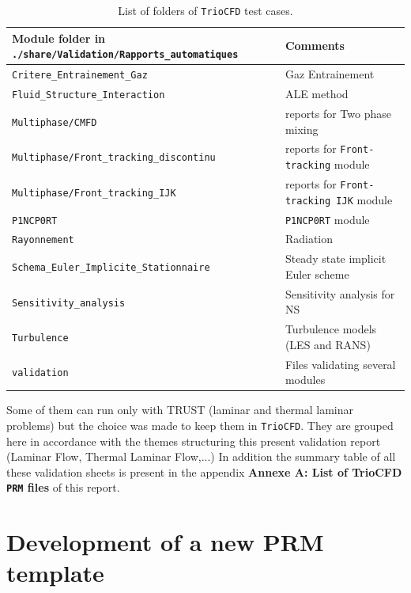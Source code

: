 \begin{table}[H]
\begin{centering}
\begin{tabular}{ll}
\hline 
\textbf{Module folder in \texttt{./share/Validation/Rapports\_automatiques}} & \textbf{Comments}
\tabularnewline
\hline 
\texttt{\footnotesize{}Critere\_Entrainement\_Gaz} & {\small{}Gaz Entrainement}
\tabularnewline
\texttt{\footnotesize{}Fluid\_Structure\_Interaction} & {\small{}ALE method}
\tabularnewline
\texttt{\footnotesize{}Multiphase/CMFD} & {\small{}reports for Two phase mixing}
\tabularnewline
\texttt{\footnotesize{}Multiphase/Front\_tracking\_discontinu} & {\small{}reports for }\texttt{\small{}Front-tracking}{\small{} module}
\tabularnewline
\texttt{\footnotesize{}Multiphase/Front\_tracking\_IJK} & {\small{}reports for }\texttt{\small{}Front-tracking IJK}{\small{} module}
\tabularnewline
\texttt{\footnotesize{}P1NCP0RT} & \texttt{\small{}P1NCP0RT}{\small{} module}
\tabularnewline
\texttt{\footnotesize{}Rayonnement} & {\small{}Radiation}
\tabularnewline
\texttt{\footnotesize{}Schema\_Euler\_Implicite\_Stationnaire} & {\small{}Steady state implicit Euler scheme}
\tabularnewline
\texttt{\footnotesize{}Sensitivity\_analysis} & {\small{}Sensitivity analysis for NS}
\tabularnewline
\texttt{\footnotesize{}Turbulence} & {\small{}Turbulence models (LES and RANS)}
\tabularnewline
\texttt{\footnotesize{}validation} & {\small{}Files validating several modules}
\tabularnewline
\hline 
\end{tabular}
\par\end{centering}
\caption{\label{tab:List-of-folders}List of folders of \texttt{TrioCFD} test cases.}
\end{table}

Some of them can run only with TRUST (laminar and thermal laminar problems)
but the choice was made to keep them in \texttt{TrioCFD}.
They are grouped here in accordance with the themes structuring
this present validation report (Laminar Flow, Thermal Laminar Flow,...)
In addition the summary table of all these validation sheets
is present in the appendix \textbf{Annexe A: List of TrioCFD \texttt{PRM} files} of this report.

\section{Development of a new \textsf{PRM} template}

